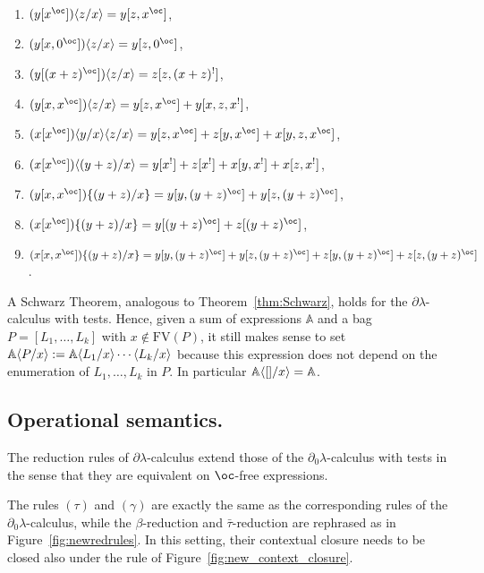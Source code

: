 \documentclass{LMCS}
\newcommand{\dlam}{\ensuremath{\partial\lambda}}
\newcommand{\dzlam}{\ensuremath{\partial_0\lambda}}
\newcommand{\bang}{\oc}
\newcommand{\FV}{\mathrm{FV}}
\newcommand{\subst}[2]{\{ #2 / #1 \}}	\newcommand{\dg}[2]{\mathrm{deg}_{#1}(#2)} \newcommand{\obsle}{\sqsubseteq_{\mathcal{O}}}
\newcommand{\ass}{:=}
\newcommand{\sA}{\mathbb{A}}
\newcommand{\gto}{\ensuremath{\bar\tau}}
\begin{document}
\begin{exa} \ 
\begin{enumerate}[1.]
\item $(y[x^\bang])\lsubst{x}{z} = y[z,x^\bang] $,
\item $(y[x,0^\bang])\lsubst{x}{z} = y[z,0^\bang] $,
\item $(y[(x+z)^\bang])\lsubst{x}{z} = z[z,(x+z)^!]$,
\item $(y[x,x^\bang])\lsubst{x}{z} = y[z,x^\bang] + y[x,z,x^!]$,
\item $(x[x^\bang])\lsubst{x}{y}\lsubst{x}{z} = y[z,x^\bang] + z[y,x^\bang] + x[y,z,x^\oc]$,
\item $(x[x^\bang])\lsubst{x}{(y+z)} = y[x^!] + z[x^!] + x[y,x^!]+ x[z,x^!]$,
\item $(y[x,x^\oc])\subst{x}{(y+z)} = y[y,(y+z)^\oc] + y[z,(y+z)^\oc]$,
\item $(x[x^\oc])\subst{x}{(y+z)} = y[(y+z)^\oc] + z[(y+z)^\oc]$,
\item $(x[x,x^\oc])\subst{x}{(y+z)} = y[y,(y+z)^\oc] + y[z,(y+z)^\oc] + z[y,(y+z)^\oc] + z[z,(y+z)^\oc]$.
\end{enumerate}
\end{exa}



A Schwarz Theorem, analogous to Theorem~\ref{thm:Schwarz}, holds for the \dlam-calculus with tests. 
Hence, given a sum of expressions $\sA$ and a bag $P = [L_1,\ldots,L_k]$ with $x\notin\FV(P)$, 
it still makes sense to set $\sA\lsubst{x}{P}\ass\sA\lsubst{x}{L_1}\cdots \lsubst{x}{L_k}$ because 
this expression does not depend on the enumeration of $L_1,\ldots,L_k$ in $P$. 
In particular $\sA\lsubst{x}{[]} = \sA$.

\subsection{Operational semantics.} 
The reduction rules of $ \dlam$-cal\-cu\-lus extend those of the \dzlam-calculus with tests in the sense that they 
are equivalent on $\bang$-free expressions.

\begin{defi}
The rules $(\tau)$ and  $(\gamma)$ are exactly the same as the corresponding rules of the \dzlam-calculus,
while the $\beta$-reduction and $\gto$-reduction are rephrased as in Figure~\ref{fig:newredrules}.
In this setting, their contextual closure needs to be closed also under the rule of Figure~\ref{fig:new_context_closure}.
\end{defi}
\end{document}

